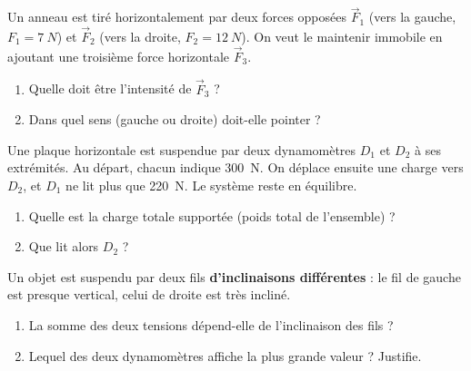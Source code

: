 \documentclass[11pt,a4paper]{article}
\newcommand{\vv}[1]{\vec{#1}}\newcommand{\ds}{\displaystyle}
\begin{document}
\begin{exo}
Un anneau est tiré horizontalement par deux forces opposées $\vv F_1$ (vers la gauche,
$F_1=\qty{7}{N}$) et $\vv F_2$ (vers la droite, $F_2=\qty{12}{N}$). On veut le maintenir immobile en
ajoutant une troisième force horizontale $\vv F_3$.
\begin{center}
\end{center}
\begin{enumerate}[label=\alph*)]
  \item Quelle doit être l'intensité de $\vv F_3$ ?
  \item Dans quel sens (gauche ou droite) doit-elle pointer ?
\end{enumerate}
\end{exo}

\begin{exo}
Une plaque horizontale est suspendue par deux dynamomètres $D_1$ et $D_2$ à ses extrémités. Au
départ, chacun indique \qty{300}{N}. On déplace ensuite une charge vers $D_2$, et $D_1$ ne lit plus
que \qty{220}{N}. Le système reste en équilibre.
\begin{enumerate}[label=\alph*)]
  \item Quelle est la charge totale supportée (poids total de l'ensemble) ?
  \item Que lit alors $D_2$ ?
\end{enumerate}
\end{exo}

\begin{exo}
Un objet est suspendu par deux fils \textbf{d'inclinaisons différentes} : le fil de gauche est presque
vertical, celui de droite est très incliné.
\begin{center}
\end{center}
\begin{enumerate}[label=\alph*)]
  \item La somme des deux tensions dépend-elle de l'inclinaison des fils ?
  \item Lequel des deux dynamomètres affiche la plus grande valeur ? Justifie.
\end{enumerate}
\end{exo}
\end{document}
